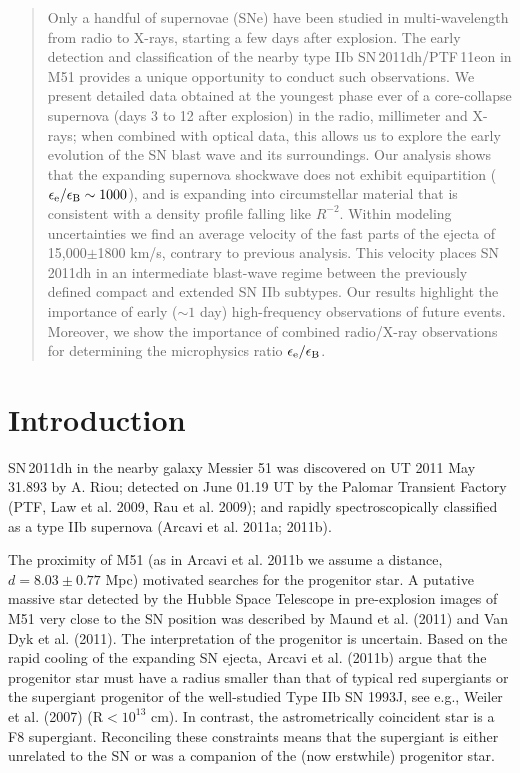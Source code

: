 \documentclass{emulateapj}
\begin{document}
\begin{abstract}

Only a handful of supernovae (SNe) have been studied in
multi-wavelength from radio to X-rays, starting a few days after
explosion. The early detection and classification of the nearby type
IIb SN\,2011dh/PTF\,11eon in M51 provides a unique opportunity to
conduct such observations. We present detailed data obtained at the youngest phase
ever of a core-collapse supernova (days 3 to 12 after explosion) in
the radio, millimeter and X-rays; when combined with
optical data, this allows us to explore the early evolution of the SN
blast wave and its surroundings. Our analysis shows that the expanding
supernova shockwave does not exhibit equipartition
($\epsilon_{\rm e}/\epsilon_{\rm B}\sim 1000$), and is expanding
into circumstellar material that is consistent with a density
profile falling like $R^{-2}$. Within modeling uncertainties we find
an average velocity of the fast parts of the ejecta of 15,000$\pm$1800 km/s, contrary to previous
analysis. This velocity places SN 2011dh in an intermediate blast-wave regime
between the previously defined compact and extended SN IIb
subtypes. Our results highlight the importance of early ($\sim1$ day)
high-frequency observations of future events. Moreover, we show the importance
of combined radio/X-ray observations for determining the microphysics ratio $\epsilon_{\rm e}/\epsilon_{\rm B}$.

\end{abstract}


\section{Introduction}

SN\,2011dh  in the nearby galaxy Messier 51 was discovered on UT
2011 May 31.893 by A. Riou; detected on June 01.19 UT by the Palomar
Transient Factory (PTF, Law et al. 2009, Rau et al. 2009); and
rapidly spectroscopically classified as a type IIb supernova (Arcavi
et al. 2011a; 2011b).

The proximity of M51 (as in Arcavi et al. 2011b we assume a distance,
$d=8.03\pm 0.77$ Mpc) motivated searches for the progenitor star.
A putative massive star detected by the Hubble Space Telescope in pre-explosion images of M51 very close to the SN position
was
described by Maund et al. (2011) and Van Dyk et al. (2011).  The
interpretation of the progenitor is uncertain. Based on the rapid cooling of the expanding SN
ejecta, Arcavi et al. (2011b) argue that the progenitor star must
have a radius smaller than that of typical red supergiants or the
supergiant progenitor of the well-studied Type IIb SN 1993J, see e.g.,
Weiler et al. (2007)
(R$<10^{13}$ cm).  In contrast, the astrometrically coincident star
is  a F8 supergiant. Reconciling these constraints means that
the supergiant is either unrelated to the SN or was a companion of the
(now erstwhile) progenitor star.
\end{document}
